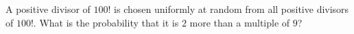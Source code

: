 A positive divisor of $100!$ is chosen uniformly at random from all positive divisors of $100!$. What is the probability that it is $2$ more than a multiple of $9$?
